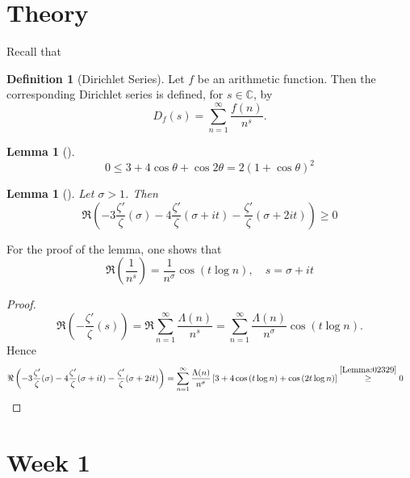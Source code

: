 \documentclass[reqno]{amsart}
\newtheorem{lemma}[theorem]{Lemma}
\theoremstyle{definition}
\newtheorem{definition}[theorem]{Definition}
\theoremstyle{remark}
\begin{document}
\section{Theory}


    Recall that
    \begin{definition}[Dirichlet Series]
        Let $f$ be an arithmetic function. Then the corresponding
        Dirichlet series is defined, for
        $s \in \mathbb{C}$, by
        \[
        D_f (s) = \sum_{n=1}^{\infty} \frac{f(n)}{n^{s}}.
        \] 
    \end{definition}


    \begin{lemma}[]\label{Lemma:02329}
        \[
        0 \le 3 + 4 \cos \theta + \cos 2\theta = 
        2 \left( 1+ \cos \theta \right)^2
        \] 
    \end{lemma}

    \begin{lemma}[]
        Let $\sigma > 1$. Then
        \[
        \Re \left( -3 \frac{\zeta '}{\zeta} (\sigma)-
        4 \frac{\zeta'}{\zeta}(\sigma + it)-
    \frac{\zeta'}{\zeta}(\sigma + 2 i t)\right) \ge 0
        \] 
    \end{lemma}

    For the proof of the lemma, one shows that
    \[
    \Re \left( \frac{1}{n^{s}} \right) =
    \frac{1}{n^{\sigma}} \cos \left( t \log n \right) , \quad
    s = \sigma + it \tag{$A_1$} \label{A-1}
    \] 

    \begin{proof}
        \[
        \Re \left( - \frac{\zeta'}{\zeta}(s) \right) 
        = \Re \sum_{n=1}^{\infty} \frac{\Lambda (n)}{n^{s}}
        = \sum_{n=1}^{\infty} \frac{\Lambda(n)}{n^{\sigma}}
        \cos \left( t \log n \right) .
        \] 
        Hence
        \begin{align*}
        \Re \left( -3 \frac{\zeta '}{\zeta} (\sigma)-
        4 \frac{\zeta'}{\zeta}(\sigma + it)-
    \frac{\zeta'}{\zeta}(\sigma + 2 i t)\right) 
    &= \sum_{n=1}^{\infty} \frac{\Lambda(n)}{n^{\sigma}}
    \left[ 3 + 4 \cos \left( t \log n \right) +
    \cos \left( 2t \log n \right) \right] 
    \stackrel{\eqref{Lemma:02329}}{\ge} 0
        \end{align*}
    \end{proof}


\newpage

\section{Week 1}
\end{document}
